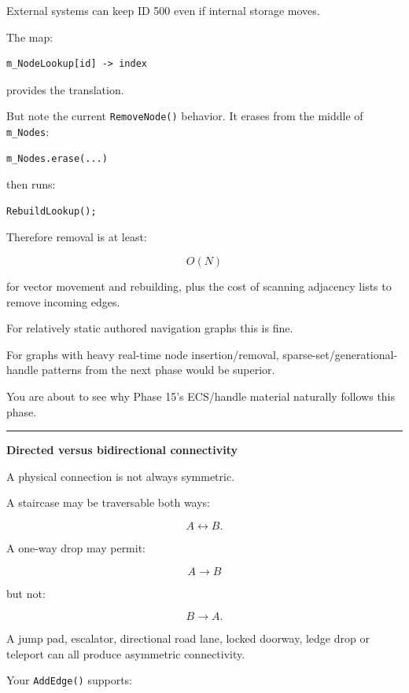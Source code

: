 External systems can keep ID 500 even if internal storage moves.

The map:

\begin{verbatim}
m_NodeLookup[id] -> index
\end{verbatim}

provides the translation.

But note the current \texttt{RemoveNode()} behavior. It erases from the middle of \texttt{m\_Nodes}:

\begin{verbatim}
m_Nodes.erase(...)
\end{verbatim}

then runs:

\begin{verbatim}
RebuildLookup();
\end{verbatim}

Therefore removal is at least:

\[
O(N)
\]

for vector movement and rebuilding, plus the cost of scanning adjacency lists to remove incoming edges.

For relatively static authored navigation graphs this is fine.

For graphs with heavy real-time node insertion/removal, sparse-set/generational-handle patterns from the next phase would be superior.

You are about to see why Phase 15's ECS/handle material naturally follows this phase.

\begin{center}\rule{0.5\linewidth}{0.5pt}\end{center}

\textbf{Directed versus bidirectional connectivity}

A physical connection is not always symmetric.

A staircase may be traversable both ways:

\[
A\leftrightarrow B.
\]

A one-way drop may permit:

\[
A\rightarrow B
\]

but not:

\[
B\rightarrow A.
\]

A jump pad, escalator, directional road lane, locked doorway, ledge drop or teleport can all produce asymmetric connectivity.

Your \texttt{AddEdge()} supports:

